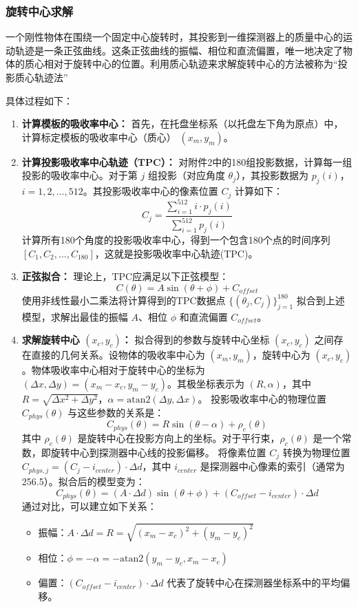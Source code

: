 \subsubsection{旋转中心求解}

一个刚性物体在围绕一个固定中心旋转时，其投影到一维探测器上的质量中心的运动轨迹是一条正弦曲线。这条正弦曲线的振幅、相位和直流偏置，唯一地决定了物体的质心相对于旋转中心的位置。利用质心轨迹来求解旋转中心的方法被称为“投影质心轨迹法”\par
具体过程如下：
\begin{enumerate}
    \item \textbf{计算模板的吸收率中心：} 首先，在托盘坐标系（以托盘左下角为原点）中，计算标定模板的吸收率中心（质心） $(x_m,y_m)$。
    \item \textbf{计算投影吸收率中心轨迹（TPC）：} 对附件2中的180组投影数据，计算每一组投影的吸收率中心。对于第 $j$ 组投影（对应角度 $\theta_j$），其投影数据为 $p_j(i)$，$i=1,2,...,512$。其投影吸收率中心的像素位置 $C_j$ 计算如下：
       $$C_j=\frac{\sum_{i=1}^{512}i\cdot p_j(i)}{\sum_{i=1}^{512}p_j(i)}$$
       计算所有180个角度的投影吸收率中心，得到一个包含180个点的时间序列 $[C_1,C_2,...,C_{180}]$，这就是投影吸收率中心轨迹(TPC)。
    \item \textbf{正弦拟合：} 理论上，TPC应满足以下正弦模型：
       $$C(\theta)=A\sin(\theta+\phi)+C_{offset}$$
       使用非线性最小二乘法将计算得到的TPC数据点 $\{(\theta_j,C_j)\}_{j=1}^{180}$ 拟合到上述模型，求解出最佳的振幅 $A$、相位 $\phi$ 和直流偏置 $C_{offset}$。
    \item \textbf{求解旋转中心 $(x_c,y_c)$：} 拟合得到的参数与旋转中心坐标 $(x_c,y_c)$ 之间存在直接的几何关系。设物体的吸收率中心为 $(x_m,y_m)$，旋转中心为 $(x_c,y_c)$。物体吸收率中心相对于旋转中心的坐标为 $(\Delta x,\Delta y)=(x_m-x_c,y_m-y_c)$。其极坐标表示为 $(R,\alpha)$，其中 $R=\sqrt{\Delta x^2+\Delta y^2}$，$\alpha=\text{atan2}(\Delta y,\Delta x)$。
       投影吸收率中心的物理位置 $C_{phys}(\theta)$ 与这些参数的关系是：
       $$C_{phys}(\theta)=R\sin(\theta-\alpha)+\rho_c(\theta)$$
       其中 $\rho_c(\theta)$ 是旋转中心在投影方向上的坐标。对于平行束，$\rho_c(\theta)$ 是一个常数，即旋转中心到探测器中心线的投影偏移。
       将像素位置 $C_j$ 转换为物理位置 $C_{phys,j}=(C_j-i_{center})\cdot\Delta d$，其中 $i_{center}$ 是探测器中心像素的索引（通常为256.5）。拟合后的模型变为：
       $$C_{phys}(\theta)=(A\cdot\Delta d)\sin(\theta+\phi)+(C_{offset}-i_{center})\cdot\Delta d$$
       通过对比，可以建立如下关系：
       \begin{itemize}
           \item 振幅：$A\cdot\Delta d=R=\sqrt{(x_m-x_c)^2+(y_m-y_c)^2}$
           \item 相位：$\phi=-\alpha=-\text{atan2}(y_m-y_c,x_m-x_c)$
           \item 偏置：$(C_{offset}-i_{center})\cdot\Delta d$ 代表了旋转中心在探测器坐标系中的平均偏移。
       \end{itemize}
\end{enumerate}


